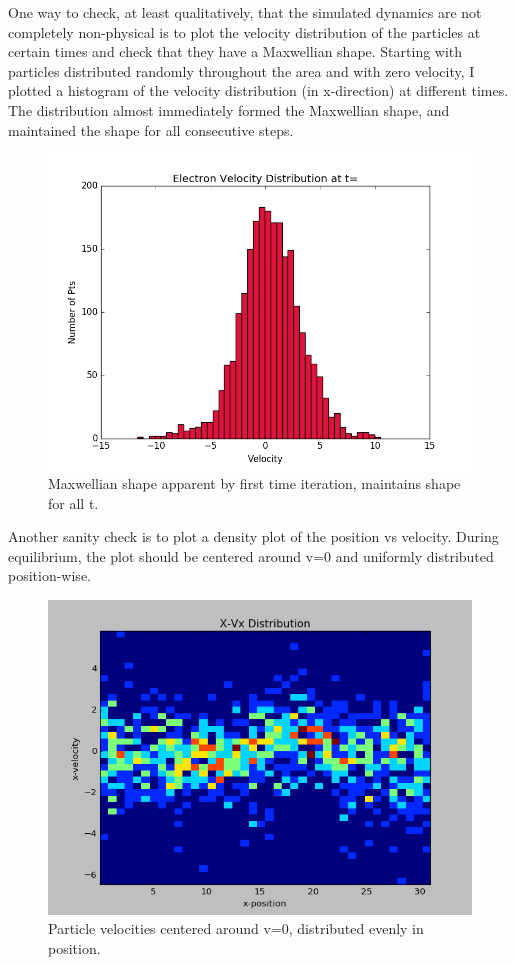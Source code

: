 \documentclass{article}
\begin{document}
\newline
One way to check, at least qualitatively, that the simulated dynamics are not completely non-physical is to plot the velocity distribution of the particles at certain times and check that they have a Maxwellian shape. \newline
Starting with particles distributed randomly throughout the area and with zero velocity, I plotted a histogram of the velocity distribution (in x-direction) at different times. The distribution almost immediately formed the Maxwellian shape, and maintained the shape for all consecutive steps. 
\begin{figure}[H]
\begin{center}
\includegraphics[scale=0.5]{vx_vel_dist.png}
\caption{Maxwellian shape apparent by first time iteration, maintains shape for all t.}
\end{center}
\end{figure}
Another sanity check is to plot a density plot of the position vs velocity. During equilibrium, the plot should be centered around v=0 and uniformly distributed position-wise. 
\begin{figure}[H]
\begin{center}
\includegraphics[scale=0.8]{X-vs_Vx_dist_imshow.png}
\caption{Particle velocities centered around v=0, distributed evenly in position.}
\end{center}
\end{figure}
\end{document}
